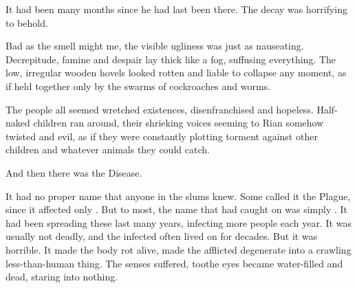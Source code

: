 \begin{comment}
\subsection{Decrepitude}
\end{comment}

It had been many months since he had last been there. 
The decay was horrifying to behold. 


Bad as the smell might me, 
the visible ugliness was just as nauseating. 
Decrepitude, famine and despair lay thick like a fog, suffusing everything. 
The low, irregular wooden hovels looked rotten and liable to collapse any moment, as if held together only by the swarms of cockroaches and worms. 

The people all seemed wretched existences, disenfranchised and hopeless. 
Half-naked children ran around, 
their shrieking voices seeming to Rian somehow twisted and evil, as if they were constantly plotting torment against other children and whatever animals they could catch. 


And then there was the Disease. 

It had no proper name that anyone in the slums knew. 
Some called it the \Human{} Plague, since it affected only \humans. 
But to most, the name that had caught on was simply . 
It had been spreading these last many years, infecting more people each year. 
It was usually not deadly, and the infected often lived on for decades. 
But it was horrible. 
It made the body rot alive, made the afflicted degenerate into a crawling less-than-human thing. 
The senses suffered, too\dash the eyes became water-filled and dead, staring into nothing. 

